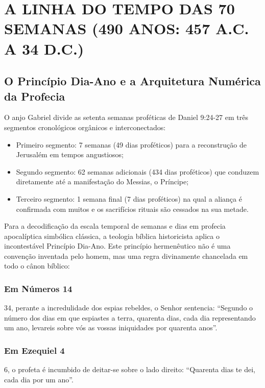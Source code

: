 \section{A LINHA DO TEMPO DAS 70 SEMANAS (490 ANOS: 457 A.C. A 34 D.C.)}



\subsection{O Princípio Dia-Ano e a Arquitetura Numérica da Profecia}


O anjo Gabriel divide as setenta semanas proféticas de Daniel 9:24-27 em três segmentos cronológicos orgânicos e interconectados:
\begin{itemize}
  \item Primeiro segmento: 7 semanas (49 dias proféticos) para a reconstrução de Jerusalém em tempos angustiosos;
  \item Segundo segmento: 62 semanas adicionais (434 dias proféticos) que conduzem diretamente até a manifestação do Messias, o Príncipe;
  \item Terceiro segmento: 1 semana final (7 dias proféticos) na qual a aliança é confirmada com muitos e os sacrifícios rituais são cessados na sua metade.
\end{itemize}


Para a decodificação da escala temporal de semanas e dias em profecia apocalíptica simbólica clássica, a teologia bíblica historicista aplica o incontestável Princípio Dia-Ano. Este princípio hermenêutico não é uma convenção inventada pelo homem, mas uma regra divinamente chancelada em todo o cânon bíblico:

\subsubsection*{Em Números 14}
34, perante a incredulidade dos espias rebeldes, o Senhor sentencia: ``Segundo o número dos dias em que espiastes a terra, quarenta dias, cada dia representando um ano, levareis sobre vós as vossas iniquidades por quarenta anos''.

\subsubsection*{Em Ezequiel 4}
6, o profeta é incumbido de deitar-se sobre o lado direito: ``Quarenta dias te dei, cada dia por um ano''.

